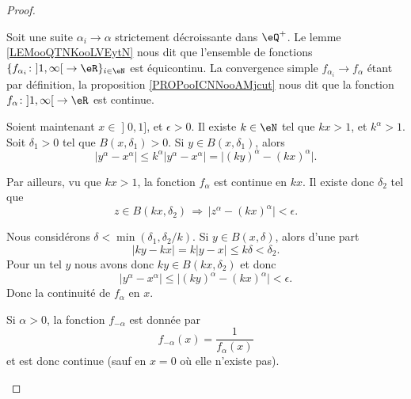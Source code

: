 \begin{proof}
\begin{subproof}
\begin{subproof}
			Soit une suite \( \alpha_i\to \alpha\) strictement décroissante dans \( \eQ^+\). Le lemme \ref{LEMooQTNKooLVEytN} nous dit que l'ensemble de fonctions  \( \{ f_{\alpha_i}\colon \mathopen] 1 , \infty \mathclose[\to \eR \}_{i\in \eN}\) est équicontinu. La convergence simple \( f_{\alpha_i}\to f_{\alpha}\) étant par définition, la proposition \ref{PROPooICNNooAMjcut} nous dit que la fonction \( f_{\alpha}\colon \mathopen] 1 , \infty \mathclose[\to \eR\) est continue.


            Soient maintenant \( x\in \mathopen] 0 , 1 \mathclose]\), et \( \epsilon>0\). Il existe \( k\in \eN\) tel que \( kx>1\), et \( k^{\alpha}>1\). Soit \( \delta_1>0\) tel que \( B(x,\delta_1)>0\). Si \( y\in B(x,\delta_1)\), alors
            \begin{equation}
                | y^{\alpha}-x^{\alpha} |\leq k^{\alpha}| y^{\alpha}-x^{\alpha} |=\big| (ky)^{\alpha}-(kx)^{\alpha} \big|.
            \end{equation}
            
            Par ailleurs, vu que \( kx>1\), la fonction \( f_{\alpha}\) est continue en \( kx\). Il existe donc \( \delta_2\) tel que 
            \begin{equation}
                z\in B(kx,\delta_2)\,\Rightarrow\,\big| z^{\alpha}-(kx)^{\alpha} \big|<\epsilon.
            \end{equation}
            
            Nous considérons \( \delta<\min(\delta_1,\delta_2/k)\). Si \( y\in B(x,\delta)\), alors d'une part
            \begin{equation}
                | ky-kx |=k| y-x |\leq k\delta<\delta_2.
            \end{equation}
            Pour un tel \( y\) nous avons donc \( ky\in B(kx,\delta_2)\) et donc
            \begin{equation}
                | y^{\alpha}-x^{\alpha} |\leq \big| (ky)^{\alpha}-(kx)^{\alpha} \big|<\epsilon.
            \end{equation}
            Donc la continuité de \( f_{\alpha}\) en \( x\).

	\end{subproof}
        

		Si \( \alpha>0\), la fonction \( f_{-\alpha}\) est donnée par
		\begin{equation}
			f_{-\alpha}(x)=\frac{1}{  f_{\alpha}(x) }
		\end{equation}
		et est donc continue (sauf en \( x=0\) où elle n'existe pas).
	\end{subproof}
\end{proof}

